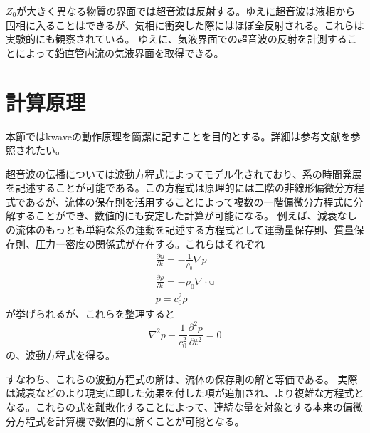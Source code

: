 \documentclass[uplatex]{suribt}
\begin{document}
$Z_0$が大きく異なる物質の界面では超音波は反射する。ゆえに超音波は液相から固相に入ることはできるが、気相に衝突した際にはほぼ全反射される。これらは実験的にも観察されている。
ゆえに、気液界面での超音波の反射を計測することによって鉛直管内流の気液界面を取得できる。

\section{計算原理}
本節ではkwaveの動作原理を簡潔に記すことを目的とする。詳細は参考文献\cite{treeby2010k}を参照されたい。\par
超音波の伝播については波動方程式によってモデル化されており、系の時間発展を記述することが可能である。この方程式は原理的には二階の非線形偏微分方程式であるが、流体の保存則を活用することによって複数の一階偏微分方程式に分解することができ、数値的にも安定した計算が可能になる。
例えば、減衰なしの流体のもっとも単純な系の運動を記述する方程式として運動量保存則、質量保存則、圧力ー密度の関係式が存在する。これらはそれぞれ
\begin{align}
    \frac{\partial \mathbb{u}}{\partial t }= -\frac{1}{\rho_0} \nabla p \\
    \frac{\partial \rho}{\partial t} = - \rho_0 \nabla \cdot \mathbb{u} \\
    p= c_0 ^2 \rho
\end{align}
が挙げられるが、これらを整理すると
\begin{equation}
    \nabla^2p - \frac{1}{c_0^2} \frac{\partial ^2 p}{\partial t^2} =0 
\end{equation}
の、波動方程式を得る。\par
すなわち、これらの波動方程式の解は、流体の保存則の解と等価である。
実際は減衰などのより現実に即した効果を付した項が追加され、より複雑な方程式となる。これらの式を離散化することによって、連続な量を対象とする本来の偏微分方程式を計算機で数値的に解くことが可能となる。
\end{document}
